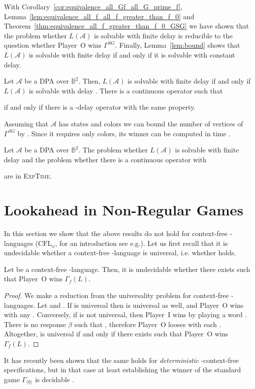 \documentclass[fleqn,envcountsame]{LMCS}
\newcommand{\aut}[1]{\ensuremath{\mathcal{#1}}}
\newcommand{\pI}{Player~I\xspace}
\newcommand{\pO}{Player~O\xspace}
\newcommand{\GSG}{\ensuremath{\Gamma^{SG}}\xspace}
\newcommand{\Gd}[1]{\ensuremath{\Gamma_{#1}}\xspace}
\newcommand{\GdL}[1]{\ensuremath{\Gamma_{#1}(L)}\xspace}
\newcommand{\LA}{\ensuremath{L(\aut{A})}\xspace}
\newcommand{\const}[1]{\ensuremath{\langle#1\rangle}\xspace}
\newcommand{\Bsq}{\ensuremath{\mathbb{B}^2}\xspace}
\newcommand{\be}{\ensuremath{\beta}\xspace}
\newcommand{\ie}{i.e.\xspace}
\newcommand{\eg}{e.g.\xspace}
\newcommand{\CFLom}{\ensuremath{\mathrm{CFL}_{\omega}}}
\begin{document}
With Corollary~\ref{cor:equivalence_all_Gf_all_G_prime_f}, Lemma~\ref{lem:equivalence_all_f_all_f_greater_than_f_0}
and Theorem~\ref{thm:equivalence_all_f_greater_than_f_0_GSG} we have shown that the problem whether
\LA is solvable with finite delay is reducible to the question whether
\pO wins \GSG. Finally, Lemma~\ref{lem:bound} shows that
\LA is solvable with finite delay if and only if it is solvable with constant delay.

\begin{thm}\label{thm:main}
Let \aut{A} be a DPA over \Bsq. Then, \LA is solvable with finite delay
if and only if \LA is solvable with delay .
There is a continuous operator  such that

if and only if there is a -delay operator with the same property.
\end{thm}

Assuming that \aut{A} has  states and  colors
we can bound the number of vertices of \GSG by .
Since it requires only  colors,
its winner can be computed in time  \cite{Sch07ParGameBigSteps}.

\begin{cor}\label{cor:decide_bounded_delay}
Let \aut{A} be a DPA over \Bsq. The problem
whether \LA is solvable with finite delay
and the problem whether there is a continuous operator  with

are in \textsc{ExpTime}.
\end{cor}



\section{Lookahead in Non-Regular Games}\label{sec:pusdown_games_delay}

In this section we show that the above results do not hold for context-free
-languages (\CFLom, for an introduction see \eg \cite{CG78OmegaComputDetPushMach}).
Let us first recall that it is undecidable whether a context-free
-language  is universal, \ie whether  holds.

\begin{thm}\label{thm:finkel_context_free_gale_stewart_undecidable}
Let  be a context-free -language.
Then, it is undecidable whether there exists  such that \pO wins \GdL{f}.
\end{thm}
\begin{proof}
We make a reduction from the universality problem for context-free -languages.
Let  and .
If  is universal then  is universal as well, and \pO wins
with any .
Conversely, if  is not universal, then \pI wins by playing a word .
There is no response \be such that , therefore
\pO looses with each .
Altogether,  is universal if and only if
there exists  such that \pO wins~\GdL{f}.
\end{proof}
It has recently been shown \cite{FLZ11} that the same holds for
\emph{deterministic} -context-free specifications, but in that
case at least establishing the winner of the standard game \Gd{\const{0}}
is decidable \cite{Wal96PushProc}.
\end{document}
